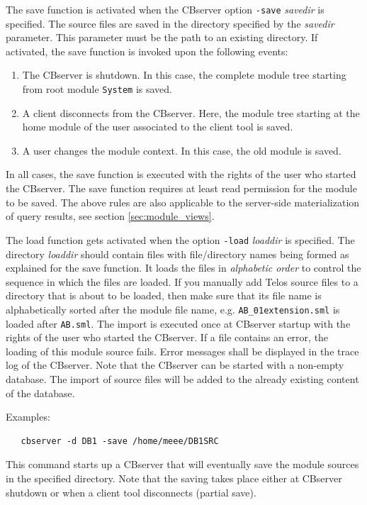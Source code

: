 The save function is activated when the CBserver option {\tt -save} {\it savedir\/} is specified.
The source files are saved in the directory specified by the {\it savedir} parameter.
This parameter must be the path to an existing directory. If activated, the
save function is invoked upon the following events:

\begin{enumerate}
\item The CBserver is shutdown. In this case, the complete module tree starting from
root module {\tt System} is saved.
\item A client disconnects from the CBserver. Here, the module tree starting at the home
module of the user associated to the client tool is saved.
\item A user changes the module context. In this case, the old module is saved.
\end{enumerate}

In all cases, the save function is executed with the
rights of the user who started the CBserver. The save function requires at least read
permission for the module to be saved. The above rules are also applicable to 
the server-side materialization of query results, see section \ref{sec:module_views}.

The load function gets activated when the option {\tt -load} {\it loaddir\/} is specified.
The directory {\it loaddir\/} should contain files with file/directory names being formed
as explained for the save function. It loads the files in {\em alphabetic order} to control
the sequence in which the files are loaded. If you manually add Telos source files
to a directory that is about to be loaded, then make sure that its file name is alphabetically
sorted after the module file name, e.g. {\tt AB\_01extension.sml} is loaded after
{\tt AB.sml}.
The import is executed once at CBserver startup with the rights of the user who
started the CBserver. If a file contains an error, the loading of this module source
fails. Error messages shall be displayed in the trace log of the CBserver. Note
that the CBserver can be started with a non-empty database. The import of source files
will be added to the already existing content of the database.

Examples:

\begin{verbatim}
   cbserver -d DB1 -save /home/meee/DB1SRC
\end{verbatim}

This command starts up a CBserver that will eventually save the module sources in the specified
 directory. Note that the saving takes place either at CBserver shutdown or when a
client tool disconnects (partial save).


